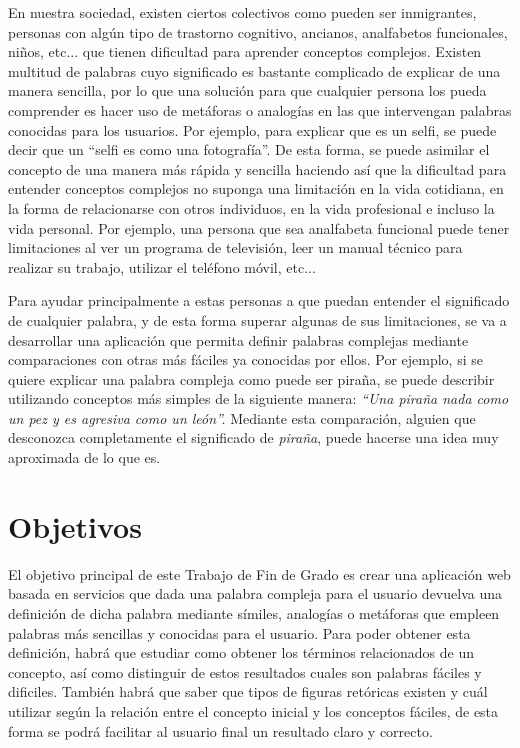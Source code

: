 En nuestra sociedad, existen ciertos colectivos como pueden ser inmigrantes, personas con algún tipo de trastorno cognitivo, ancianos, analfabetos funcionales, niños, etc... que tienen dificultad para aprender conceptos complejos. 
Existen multitud de palabras cuyo significado es bastante complicado de explicar de una manera sencilla, por lo que una solución para que cualquier persona los pueda comprender es hacer uso de metáforas o analogías en las que intervengan palabras conocidas para los usuarios. Por ejemplo, para explicar que es un selfi, se puede decir que un ``selfi es como una fotografía''. De esta forma, se puede asimilar el concepto de una manera más rápida y sencilla haciendo así que la dificultad para entender conceptos complejos no suponga una limitación en la vida cotidiana, en la forma de relacionarse con otros individuos, en la vida profesional e incluso la vida personal. 
Por ejemplo, una persona que sea analfabeta funcional puede tener limitaciones al ver un programa de televisión, leer un manual técnico para realizar su trabajo, utilizar el teléfono móvil, etc...

Para ayudar principalmente a estas personas a que puedan entender el significado de cualquier palabra, y de esta forma superar algunas de sus limitaciones, se va a desarrollar una aplicación que permita definir palabras complejas mediante comparaciones con otras más fáciles ya conocidas por ellos. Por ejemplo, si se quiere explicar una palabra compleja como puede ser piraña, se puede describir utilizando conceptos más simples de la siguiente manera:\textit{ ``Una piraña nada como un pez y es agresiva como un león''.} Mediante esta comparación, alguien que desconozca completamente el significado de \textit{piraña}, puede hacerse una idea muy aproximada de lo que es.


\section{Objetivos}
\label{cap:sec:objetivos}

El objetivo principal de este Trabajo de Fin de Grado es crear una aplicación web basada en servicios que dada una palabra compleja para el usuario devuelva una definición de dicha palabra mediante símiles, analogías o metáforas que empleen palabras más sencillas y conocidas para el usuario. 
Para poder obtener esta definición, habrá que estudiar como obtener los términos relacionados de un concepto, así como distinguir de estos resultados cuales son palabras fáciles y dificiles. 
También habrá que saber que tipos de figuras retóricas existen y cuál utilizar según la relación entre el concepto inicial y los conceptos fáciles, de esta forma se podrá facilitar al usuario final un resultado claro y correcto.

